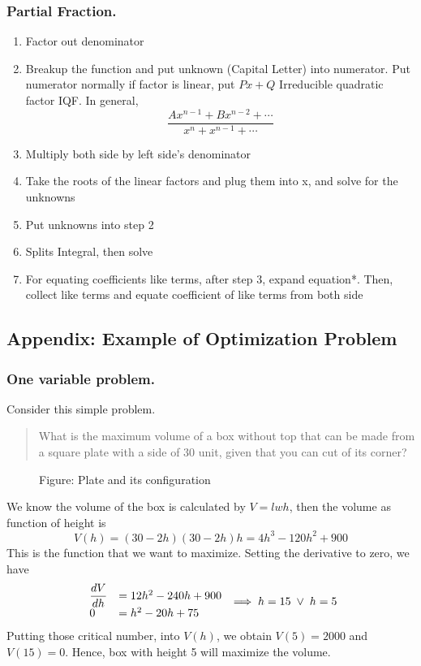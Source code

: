 \documentclass[../main.tex]{subfiles}
\begin{document}
\subsubsection*{Partial Fraction. }
\begin{enumerate}
    \item Factor out denominator
    \item Breakup the function and put unknown (Capital Letter) into numerator. Put numerator normally if factor is linear, put $Px+Q$ Irreducible quadratic factor IQF. In general, \begin{equation*}
        \frac{Ax^{n-1}+Bx^{n-2}+\cdots}{x^{n}+x^{n-1}+\cdots}
    \end{equation*}
    \item Multiply both side by left side's denominator
    \item Take the roots of the linear factors and plug them into x, and solve for the unknowns
    \item Put unknowns into step 2
    \item Splits Integral, then solve
    \item For equating coefficients like terms, after step 3, expand equation*. Then, collect like terms and equate coefficient of like terms from both side
\end{enumerate}
\clearpage

\subsection*{Appendix: Example of Optimization Problem}
\subsubsection*{One variable problem.} Consider this simple problem.
\begin{quotation}
    What is the maximum volume of a box without top that can be made from a square plate with a side of 30 unit, given that you can cut of its corner?
\end{quotation}
\begin{figure*}[b]
    \centering
    \caption*{Figure: Plate and its configuration}
\end{figure*}

We know the volume of the box is calculated by $V=lwh$, then the volume as function of height is
\begin{equation*}
    V(h)=(30-2h)(30-2h)h=4h^3-120h^2+900
\end{equation*}
This is the function that we want to maximize. Setting the derivative to zero, we have 
\begin{equation*}
    \begin{array}{l l}
        \dfrac{dV}{dh}&=12h^2-240h+900\\
        0&=h^2-20h+75
    \end{array}\implies    
    h=15\;\lor\; h=5
\end{equation*}
Putting those critical number, into $V(h)$, we obtain $V(5)=2000$ and $V(15)=0$. Hence, box with height 5 will maximize the volume.
\end{document}
